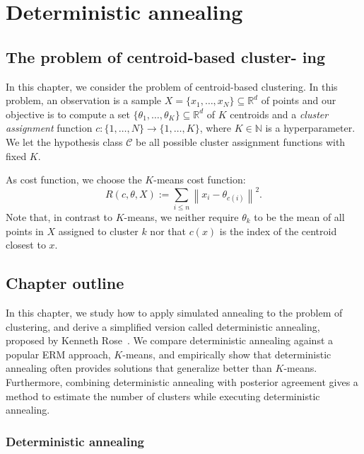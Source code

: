 \chapter{Deterministic annealing}

\section{The problem of centroid-based cluster-
ing}
\label{sec:problem}

In this chapter, we consider the problem of centroid-based clustering. In
this problem, an observation is a sample $X = \{x_1, \ldots, x_N\} \subseteq \mathbb{R}^d$ of points
and our objective is to compute a set $\{\theta_1, \ldots, \theta_K\} \subseteq \mathbb{R}^d$ of $K$ centroids and a \emph{cluster assignment} function $c : \{1, \ldots, N\} \to \{1, \ldots, K\}$, where $K \in \mathbb{N}$ is a hyperparameter.
We let the hypothesis class $\mathcal{C}$ be all possible cluster assignment functions with fixed $K$.

As cost function, we choose the $K$-means cost function:
%
\begin{equation}
R(c, \theta, X) := \sum_{i \leq n} \left\|x_i - \theta_{c(i)}\right\|^2.
\label{eq:k_means_cost_fun}
\end{equation}
%
Note that, in contrast to $K$-means, we neither require $\theta_k$ to be the mean of all points in $X$ assigned to cluster $k$ nor that $c(x)$ is the index of the centroid closest to $x$.

\section{Chapter outline}
\label{sec:chapter_outline}

In this chapter, we study how to apply simulated annealing to the problem
of clustering, and derive a simplified version called deterministic annealing, proposed by Kenneth Rose~\cite{rose1998deterministic}. We compare deterministic annealing
against a popular ERM approach, $K$-means, and empirically show that deterministic annealing often provides solutions that generalize better than
$K$-means. Furthermore, combining deterministic annealing with posterior
agreement gives a method to estimate the number of clusters while executing
deterministic annealing.

\subsection*{Deterministic annealing}

